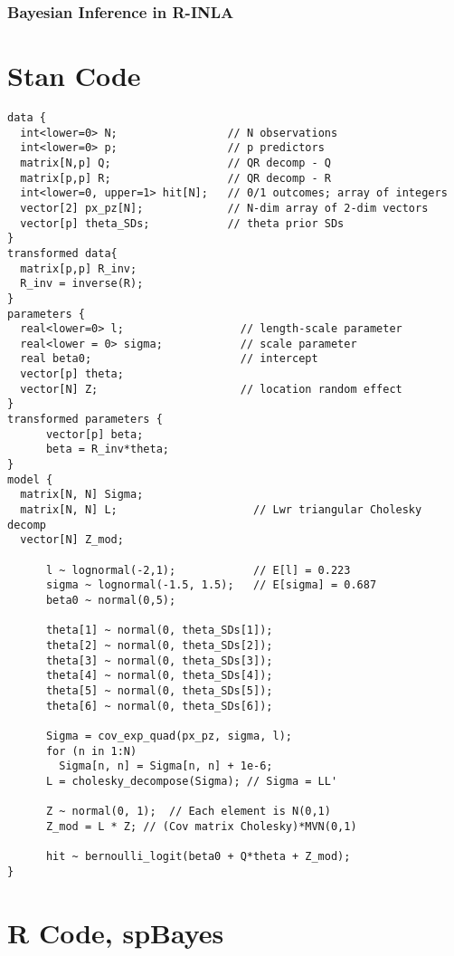 \documentclass{article}
\begin{document}
\subsubsection{Bayesian Inference in R-INLA}

\appendix
\section{Stan Code} %
\begin{verbatim}
data {                             
  int<lower=0> N;                 // N observations
  int<lower=0> p;                 // p predictors
  matrix[N,p] Q;                  // QR decomp - Q
  matrix[p,p] R;                  // QR decomp - R
  int<lower=0, upper=1> hit[N];   // 0/1 outcomes; array of integers
  vector[2] px_pz[N];             // N-dim array of 2-dim vectors
  vector[p] theta_SDs;            // theta prior SDs
}
transformed data{
  matrix[p,p] R_inv;
  R_inv = inverse(R);
}
parameters {                
  real<lower=0> l;                  // length-scale parameter
  real<lower = 0> sigma;            // scale parameter
  real beta0;                       // intercept 
  vector[p] theta;
  vector[N] Z;                      // location random effect
}
transformed parameters {
      vector[p] beta;
      beta = R_inv*theta;
}
model {  
  matrix[N, N] Sigma;
  matrix[N, N] L;                     // Lwr triangular Cholesky decomp
  vector[N] Z_mod;
      
      l ~ lognormal(-2,1);            // E[l] = 0.223
      sigma ~ lognormal(-1.5, 1.5);   // E[sigma] = 0.687
      beta0 ~ normal(0,5);
      
      theta[1] ~ normal(0, theta_SDs[1]);
      theta[2] ~ normal(0, theta_SDs[2]);
      theta[3] ~ normal(0, theta_SDs[3]);
      theta[4] ~ normal(0, theta_SDs[4]);
      theta[5] ~ normal(0, theta_SDs[5]);
      theta[6] ~ normal(0, theta_SDs[6]);
      
      Sigma = cov_exp_quad(px_pz, sigma, l); 
      for (n in 1:N)
        Sigma[n, n] = Sigma[n, n] + 1e-6;
      L = cholesky_decompose(Sigma); // Sigma = LL' 
      
      Z ~ normal(0, 1);  // Each element is N(0,1)
      Z_mod = L * Z; // (Cov matrix Cholesky)*MVN(0,1)
      
      hit ~ bernoulli_logit(beta0 + Q*theta + Z_mod);
}
\end{verbatim}

\section{R Code, spBayes} %
\end{document}
